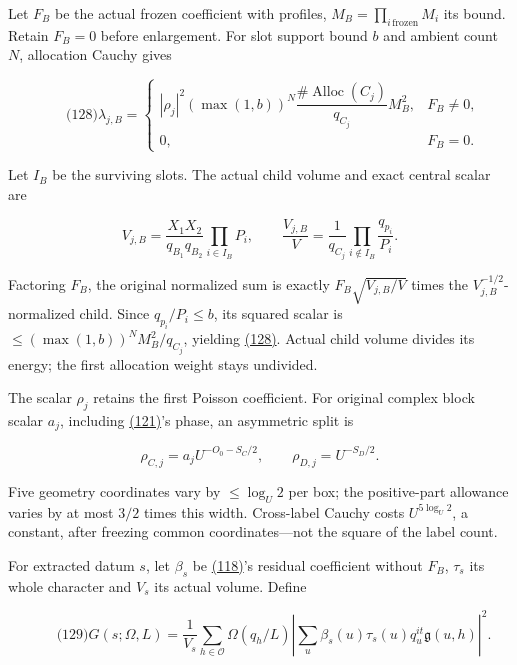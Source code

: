 Let \(F_B\) be the actual frozen coefficient with profiles, \(M_B=\prod_{i\,\mathrm{frozen}}M_i\) its bound. Retain \(F_B=0\) before enlargement. For slot support bound \(b\) and ambient count \(N\), allocation Cauchy gives

\hypertarget{sr:allocation-weight}{}

\label{sr:allocation-weight}

\[
\qquad\text{(128)}
 \lambda_{j,B}=
 \begin{cases}
 |\rho_j|^2(\max(1,b))^N
       \dfrac{\#\operatorname{Alloc}(C_j)}{q_{C_j}}M_B^2,&F_B\ne0,\\
 0,&F_B=0.
 \end{cases}
\]

Let \(I_B\) be the surviving slots. The actual child volume and exact central scalar are

\[
V_{j,B}=\frac{X_1X_2}{q_{B_1}q_{B_2}}\prod_{i\in I_B}P_i,\qquad
 \frac{V_{j,B}}V=\frac1{q_{C_j}}\prod_{i\notin I_B}\frac{q_{p_i}}{P_i}.
\]

Factoring \(F_B\), the original normalized sum is exactly \(F_B\sqrt{V_{j,B}/V}\) times the \(V_{j,B}^{-1/2}\)-normalized child. Since \(q_{p_i}/P_i\le b\), its squared scalar is \(\le(\max(1,b))^NM_B^2/q_{C_j}\), yielding \protect\hyperlink{sr:allocation-weight}{(128)}. Actual child volume divides its energy; the first allocation weight stays undivided.

The scalar \(\rho_j\) retains the first Poisson coefficient. For original complex block scalar \(a_j\), including \protect\hyperlink{sr:physical-mass}{(121)}'s phase, an asymmetric split is

\[
\rho_{C,j}=a_jU^{-O_0-S_C/2},\qquad \rho_{D,j}=U^{-S_D/2}.
\]

Five geometry coordinates vary by \(\le\log_U2\) per box; the positive-part allowance varies by at most \(3/2\) times this width. Cross-label Cauchy costs \(U^{5\log_U2}\), a constant, after freezing common coordinates---not the square of the label count.

For extracted datum \(s\), let \(\beta_s\) be \protect\hyperlink{sr:beta}{(118)}'s residual coefficient without \(F_B\), \(\tau_s\) its whole character and \(V_s\) its actual volume. Define

\hypertarget{sr:normalized-gauss}{}

\label{sr:normalized-gauss}

\[
\qquad\text{(129)}
 G(s;\Omega,L)=\frac1{V_s}\sum_{h\in\mathcal O}\Omega(q_h/L)
 \left|\sum_u\beta_s(u)\tau_s(u)q_u^{it}\mathfrak g(u,h)\right|^2 .
\]

